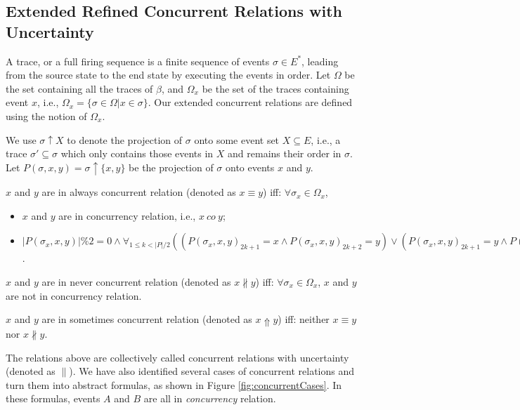 \documentclass{llncs}
\begin{document}
\subsection{Extended Refined Concurrent Relations with Uncertainty}\label{subsec:concurrent}
A trace, or a full firing sequence is a finite sequence of events $\sigma\in E^{*}$, leading from the source state to the end state by executing the events in order. Let $\Omega$ be the set containing all the traces of $\beta$, and $\Omega_{x}$ be the set of the traces containing event $x$, i.e., $\Omega_{x}=\{\sigma\in\Omega|x\in\sigma\}$. Our extended concurrent relations are defined using the notion of $\Omega_{x}$.

We use $\sigma\uparrow X$ to denote the projection of $\sigma$ onto some event set $X\subseteq E$, i.e., a trace $\sigma'\subseteq\sigma$ which only contains those events in $X$ and remains their order in $\sigma$. Let $P(\sigma,x,y)=\sigma\uparrow\{x,y\}$ be the projection of $\sigma$ onto events $x$ and $y$.

\begin{definition}\label{def:alwaysConcurrent}
$x$ and $y$ are in always concurrent relation (denoted as $x\equiv y$) iff: $\forall\sigma_{x}\in\Omega_{x}$,
	\begin{itemize}
		\item[-] $x$ and $y$ are in concurrency relation, i.e., $x~co~y$;
		\item[-] $|P(\sigma_{x},x,y)|\%2=0\wedge\forall_{1\leq k<|P|/2}((P(\sigma_{x},x,y)_{2k+1}=x\wedge P(\sigma_{x},x,y)_{2k+2}=y)\vee(P(\sigma_{x},x,y)_{2k+1}=y\wedge P(\sigma_{x},x,y)_{2k+2}=x)\vee(P(\sigma_{x},x,y)_{2k+1}=y\wedge P(\sigma_{x},x,y)_{2k+2}=y))$.
	\end{itemize}
\end{definition}

\begin{definition}\label{def:neverConcurrent}
$x$ and $y$ are in never concurrent relation (denoted as $x\nparallel y$) iff: $\forall\sigma_{x}\in\Omega_{x}$, $x$ and $y$ are not in concurrency relation.
\end{definition}

\begin{definition}\label{def:sometimesConcurrent}
$x$ and $y$ are in sometimes concurrent relation (denoted as $x\Uparrow y$) iff: neither $x\equiv y$ nor $x\nparallel y$.
\end{definition}

The relations above are collectively called concurrent relations with uncertainty (denoted as $\parallel$). We have also identified several cases of concurrent relations and turn them into abstract formulas, as shown in Figure \ref{fig:concurrentCases}. In these formulas, events $A$ and $B$ are all in \textit{concurrency} relation.
\end{document}
